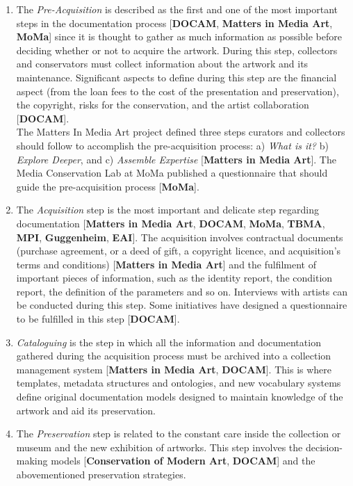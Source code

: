 \begin{enumerate}
    \item The \textit{Pre-Acquisition} is described as the first and one of the most important steps in the documentation process [\textbf{DOCAM}, \textbf{Matters in Media Art}, \textbf{MoMa}] since it is thought to gather as much information as possible before deciding whether or not to acquire the artwork. During this step, collectors and conservators must collect information about the artwork and its maintenance. Significant aspects to define during this step are the financial aspect (from the loan fees to the cost of the presentation and preservation), the copyright, risks for the conservation, and the artist collaboration [\textbf{DOCAM}].\\
    The Matters In Media Art project defined three steps curators and collectors should follow to accomplish the pre-acquisition process: a) \textit{What is it?} b) \textit{Explore Deeper}, and c) \textit{Assemble Expertise} [\textbf{Matters in Media Art}]. The Media Conservation Lab at MoMa published a questionnaire that should guide the pre-acquisition process [\textbf{MoMa}]. 
    \item The \textit{Acquisition} step is the most important and delicate step regarding documentation [\textbf{Matters in Media Art}, \textbf{DOCAM}, \textbf{MoMa}, \textbf{TBMA}, \textbf{MPI}, \textbf{Guggenheim}, \textbf{EAI}]. The acquisition involves contractual documents (purchase agreement, or a deed of gift, a copyright licence, and acquisition’s terms and conditions) [\textbf{Matters in Media Art}] and the fulfilment of important pieces of information, such as the identity report, the condition report, the definition of the parameters and so on. Interviews with artists can be conducted during this step. Some initiatives have designed a questionnaire to be fulfilled in this step [\textbf{DOCAM}].
    \item \textit{Cataloguing} is the step in which all the information and documentation gathered during the acquisition process must be archived into a collection management system [\textbf{Matters in Media Art}, \textbf{DOCAM}]. This is where templates, metadata structures and ontologies, and new vocabulary systems define original documentation models designed to maintain knowledge of the artwork and aid its preservation.\\
    \item The \textit{Preservation} step is related to the constant care inside the collection or museum and the new exhibition of artworks. This step involves the decision-making models [\textbf{Conservation of Modern Art}, \textbf{DOCAM}] and the abovementioned preservation strategies.\\

\end{enumerate}
